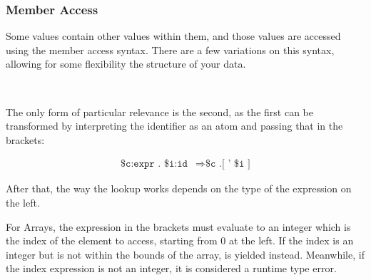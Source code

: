 \subsubsection{Member Access}

Some values contain other values within them, and those values are accessed using
the member access syntax. There are a few variations on this syntax, allowing for
some flexibility the structure of your data.

\begin{bnf*}
     \\
\end{bnf*}

The only form of particular relevance is the second, as the first can be
transformed by interpreting the identifier as an atom and passing that
in the brackets:

\begin{align*}
    \texttt{\$c:expr . \$i:id} & \Rightarrow \texttt{\$c .[ ' \$i ]} %
\end{align*}

After that, the way the lookup works depends on the type of the expression
on the left.

For Arrays, the expression in the brackets must evaluate to an integer
which is the index of the element to access, starting from 0 at the left.
If the index is an integer but is not within the bounds of the array,
 is yielded instead. Meanwhile, if the index expression is
not an integer, it is considered a runtime type error.

\begin{prooftree}
\end{prooftree}

\begin{prooftree}
\end{prooftree}


